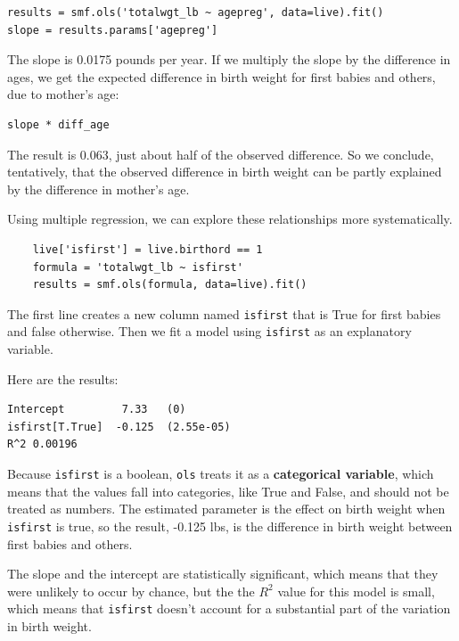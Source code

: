 \documentclass[12pt]{book}
\begin{document}
\begin{verbatim}
results = smf.ols('totalwgt_lb ~ agepreg', data=live).fit()
slope = results.params['agepreg']
\end{verbatim}

The slope is 0.0175 pounds per year.  If we multiply the slope by
the difference in ages, we get the expected difference in birth
weight for first babies and others, due to mother's age:

\begin{verbatim}
slope * diff_age
\end{verbatim}

The result is 0.063, just about half of the observed difference.
So we conclude, tentatively, that the observed difference in birth
weight can be partly explained by the difference in mother's age. 

Using multiple regression, we can explore these relationships
more systematically.

\begin{verbatim}
    live['isfirst'] = live.birthord == 1
    formula = 'totalwgt_lb ~ isfirst'
    results = smf.ols(formula, data=live).fit()
\end{verbatim}

The first line creates a new column named {\tt isfirst} that is
True for first babies and false otherwise.  Then we fit a model
using {\tt isfirst} as an explanatory variable.

Here are the results:

\begin{verbatim}
Intercept         7.33   (0)
isfirst[T.True]  -0.125  (2.55e-05)
R^2 0.00196
\end{verbatim}

Because {\tt isfirst} is a boolean, {\tt ols} treats it as a
{\bf categorical variable}, which means that the values fall
into categories, like True and False, and should not be treated
as numbers.  The estimated parameter is the effect on birth
weight when {\tt isfirst} is true, so the result,
-0.125 lbs, is the difference in
birth weight between first babies and others.  

The slope and the intercept are statistically significant,
which means that they were unlikely to occur by chance, but the
the $R^2$ value for this model is small, which means that
{\tt isfirst} doesn't account for a substantial part of the
variation in birth weight.
\end{document}
